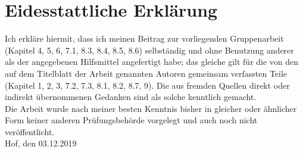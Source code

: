\chapter*{Eidesstattliche Erklärung}
Ich erkläre hiermit, dass ich meinen Beitrag zur vorliegenden Gruppenarbeit (Kapitel 4, 5, 6, 7.1, 8.3, 8.4, 8.5, 8.6)
selbständig und ohne Benutzung anderer als der angegebenen Hilfsmittel angefertigt habe; das gleiche gilt für die von den auf dem Titelblatt der Arbeit genannten Autoren gemeinsam verfassten Teile (Kapitel 1, 2, 3, 7.2, 7.3, 8.1, 8.2, 8.7, 9). 
Die aus fremden Quellen direkt oder indirekt übernommenen Gedanken sind als solche kenntlich gemacht.\\
\linebreak
Die Arbeit wurde nach meiner besten Kenntnis bisher in gleicher oder ähnlicher Form keiner anderen Prüfungsbehörde vorgelegt und auch noch nicht veröffentlicht.\\
\linebreak
\linebreak
\linebreak
Hof, den 03.12.2019


